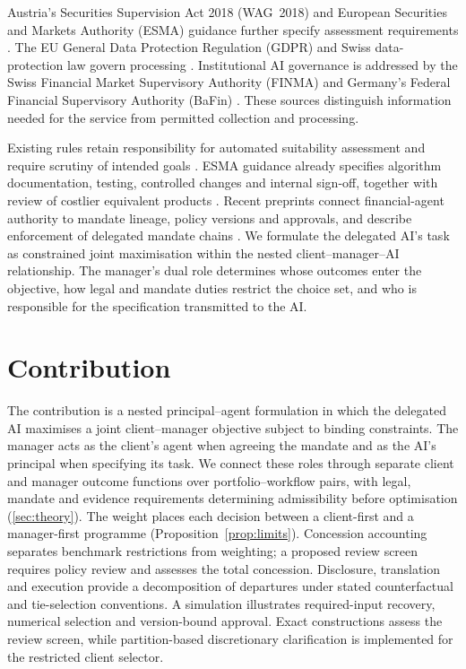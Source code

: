 \documentclass[oneside,10pt,english]{swissi}
\begin{document}
Austria's Securities Supervision Act 2018 (WAG~2018) and European Securities and Markets Authority (ESMA) guidance further specify assessment requirements \parencite{austria2018wag,esma2022suitability}. The EU General Data Protection Regulation (GDPR) and Swiss data-protection law govern processing \parencite{europeanunion2016gdpr,fdpic2025ai}. Institutional AI governance is addressed by the Swiss Financial Market Supervisory Authority (FINMA) and Germany's Federal Financial Supervisory Authority (BaFin) \parencite{finma2024ai,bafin2021bdai}. These sources distinguish information needed for the service from permitted collection and processing.

Existing rules retain responsibility for automated suitability assessment and require scrutiny of intended goals \parencites[art.~54(1)]{europeancommission2017suitability}[secs.~2.4 and 2.7]{finma2024ai}. ESMA guidance already specifies algorithm documentation, testing, controlled changes and internal sign-off, together with review of costlier equivalent products \parencite[paras.~90--95]{esma2022suitability}. Recent preprints connect financial-agent authority to mandate lineage, policy versions and approvals, and describe enforcement of delegated mandate chains \parencite{gong2026authority,racioppi2026mandato}. We formulate the delegated AI's task as constrained joint maximisation within the nested client--manager--AI relationship. The manager's dual role determines whose outcomes enter the objective, how legal and mandate duties restrict the choice set, and who is responsible for the specification transmitted to the AI.

\section{Contribution}\label{sec:contribution}

The contribution is a nested principal--agent formulation in which the delegated AI maximises a joint client--manager objective subject to binding constraints. The manager acts as the client's agent when agreeing the mandate and as the AI's principal when specifying its task. We connect these roles through separate client and manager outcome functions over portfolio--workflow pairs, with legal, mandate and evidence requirements determining admissibility before optimisation (\cref{sec:theory}). The weight places each decision between a client-first and a manager-first programme (Proposition~\ref{prop:limits}). Concession accounting separates benchmark restrictions from weighting; a proposed review screen requires policy review and assesses the total concession. Disclosure, translation and execution provide a decomposition of departures under stated counterfactual and tie-selection conventions. A simulation illustrates required-input recovery, numerical selection and version-bound approval. Exact constructions assess the review screen, while partition-based discretionary clarification is implemented for the restricted client selector.
\end{document}
